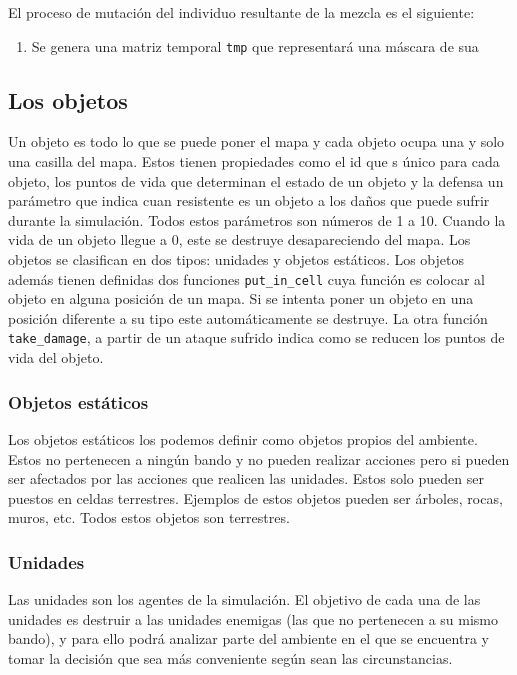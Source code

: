 El proceso de mutación del individuo resultante de la mezcla es el siguiente:

\begin{enumerate}
	\item Se genera una matriz temporal \verb|tmp| que representará una máscara de sua
\end{enumerate}

\subsection{Los objetos}

Un objeto es todo lo que se puede poner el mapa y cada objeto ocupa una y solo una casilla del mapa. Estos tienen propiedades como el id que s \'unico para cada objeto, los puntos de vida que determinan el estado de un objeto y la defensa un par\'ametro que indica cuan resistente es un objeto a los da\~{n}os que puede sufrir durante la simulaci\'on. Todos estos par\'ametros son n\'umeros de 1 a 10. Cuando la vida de un objeto llegue a 0, este se destruye desapareciendo del mapa. Los objetos se clasifican en dos tipos: unidades y objetos est\'aticos. Los objetos adem\'as tienen definidas dos funciones \verb|put_in_cell| cuya funci\'on es colocar al objeto en alguna posici\'on de un mapa. Si se intenta poner un objeto en una posici\'on diferente a su tipo este autom\'aticamente se destruye. La otra funci\'on \verb|take_damage|, a partir de un ataque sufrido indica como se reducen los puntos de vida del objeto.

\subsubsection{Objetos est\'aticos}

Los objetos est\'aticos los podemos definir como objetos propios del ambiente. Estos no pertenecen a ning\'un bando y no pueden realizar acciones pero si pueden ser afectados por las acciones que realicen las unidades. Estos solo pueden ser puestos en celdas terrestres. Ejemplos de estos objetos pueden ser \'arboles, rocas, muros, etc. Todos estos objetos son terrestres. 

\subsubsection{Unidades}

Las unidades son los agentes de la simulaci\'on. El objetivo de cada una de las unidades es destruir a las unidades enemigas (las que no pertenecen a su mismo bando), y para ello podr\'a analizar parte del ambiente en el que se encuentra y tomar la decisi\'on que sea m\'as conveniente seg\'un sean las circunstancias. 

